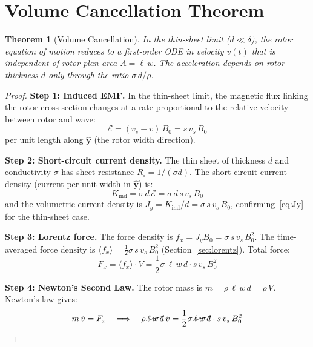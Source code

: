 \documentclass[12pt, a4paper]{article}
\theoremstyle{plain}
\newtheorem{theorem}{Theorem}[section]
\theoremstyle{definition}
\newcommand{\yhat}{\hat{\mathbf{y}}}
\newcommand{\sig}{\sigma}
\newcommand{\avg}[1]{\langle #1 \rangle}
\begin{document}
\section{Volume Cancellation Theorem}
\label{sec:volcancellation}

\begin{theorem}[Volume Cancellation]
\label{thm:volcancellation}
  In the thin-sheet limit ($d \ll \delta$), the rotor equation of motion reduces to
  a first-order ODE in velocity $v(t)$ that is \emph{independent of rotor plan-area}
  $A = \ell\,w$. The acceleration depends on rotor thickness $d$ only through the
  ratio $\sig\,d / \rho$.
\end{theorem}

\begin{proof}
  \textbf{Step 1: Induced EMF.}
  In the thin-sheet limit, the magnetic flux linking the rotor cross-section changes
  at a rate proportional to the relative velocity between rotor and wave:
  \begin{equation}
    \mathcal{E} = (v_s - v)\,B_0 = s\,v_s\,B_0
  \end{equation}
  per unit length along $\yhat$ (the rotor width direction).

  \textbf{Step 2: Short-circuit current density.}
  The thin sheet of thickness $d$ and conductivity $\sig$ has sheet resistance
  $R_\square = 1/(\sig d)$. The short-circuit current density (current per unit
  width in $\yhat$) is:
  \begin{equation}
    K_{\mathrm{ind}} = \sig\,d\,\mathcal{E} = \sig\,d\,s\,v_s\,B_0
  \end{equation}
  and the volumetric current density is $J_y = K_{\mathrm{ind}}/d = \sig\,s\,v_s\,B_0$,
  confirming~\eqref{eq:Jy} for the thin-sheet case.

  \textbf{Step 3: Lorentz force.}
  The force density is $f_x = J_y B_0 = \sig\,s\,v_s\,B_0^2$. The time-averaged
  force density is $\avg{f_x} = \tfrac{1}{2}\sig\,s\,v_s\,B_0^2$ (Section~\ref{sec:lorentz}).
  Total force:
  \begin{equation}
    F_x = \avg{f_x}\cdot V = \frac{1}{2}\sig\,\ell\,w\,d\cdot s\,v_s\,B_0^2
    \label{eq:Fx_vol}
  \end{equation}

  \textbf{Step 4: Newton's Second Law.}
  The rotor mass is $m = \rho\,\ell\,w\,d = \rho\,V$. Newton's law gives:
  \begin{equation}
    m\,\dot{v} = F_x
    \quad \Longrightarrow \quad
    \rho\,\cancel{\ell\,w\,d}\,\dot{v}
    = \frac{1}{2}\sig\,\cancel{\ell\,w\,d}\cdot s\,v_s\,B_0^2
  \end{equation}


\end{proof}
\end{document}
